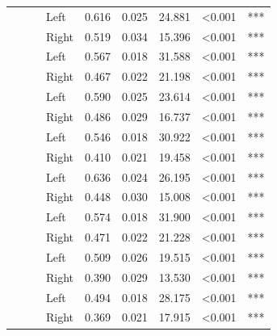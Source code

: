 \begin{longtable}[t]{>{\raggedright\arraybackslash}t{4cm}>{\raggedright\arraybackslash}t{4cm}>{\raggedright\arraybackslash}t{2.5cm}lrrrll}
\nopagebreak
 &  &  & Left & 0.616 & 0.025 & 24.881 & <0.001 & ***\\
\nopagebreak
 &  &  & Right & 0.519 & 0.034 & 15.396 & <0.001 & ***\\
\nopagebreak
 &  &  & Left & 0.567 & 0.018 & 31.588 & <0.001 & ***\\
\nopagebreak
 &  &  & Right & 0.467 & 0.022 & 21.198 & <0.001 & ***\\
\nopagebreak
 &  &  & Left & 0.590 & 0.025 & 23.614 & <0.001 & ***\\
\nopagebreak
 &  &  & Right & 0.486 & 0.029 & 16.737 & <0.001 & ***\\
\nopagebreak
 &  &  & Left & 0.546 & 0.018 & 30.922 & <0.001 & ***\\
\nopagebreak
 &  &  & Right & 0.410 & 0.021 & 19.458 & <0.001 & ***\\
\nopagebreak
 &  &  & Left & 0.636 & 0.024 & 26.195 & <0.001 & ***\\
\nopagebreak
 &  &  & Right & 0.448 & 0.030 & 15.008 & <0.001 & ***\\
\nopagebreak
 &  &  & Left & 0.574 & 0.018 & 31.900 & <0.001 & ***\\
\nopagebreak
 &  &  & Right & 0.471 & 0.022 & 21.228 & <0.001 & ***\\
\nopagebreak
 &  &  & Left & 0.509 & 0.026 & 19.515 & <0.001 & ***\\
\nopagebreak
 &  &  & Right & 0.390 & 0.029 & 13.530 & <0.001 & ***\\
\nopagebreak
 &  &  & Left & 0.494 & 0.018 & 28.175 & <0.001 & ***\\
\nopagebreak
{} &  &  & Right & 0.369 & 0.021 & 17.915 & <0.001 & ***\\

\end{longtable}
